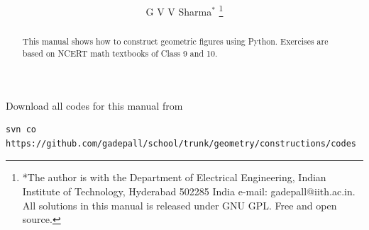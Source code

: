 \documentclass[journal,12pt,twocolumn]{IEEEtran}
\renewcommand\thesection{\arabic{section}}
\begin{document}
\let\StandardTheFigure\thefigure
\renewcommand{\thefigure}{\thesection}



\makeatletter
{}
\makeatother

\let\StandardTheFigure\thefigure
\let\StandardTheTable\thetable
\let\vec\mathbf





\def\putbox#1#2#3{\makebox[0in][l]{\makebox[#1][l]{}\raisebox{\baselineskip}[0in][0in]{\raisebox{#2}[0in][0in]{#3}}}}
     \def\rightbox#1{\makebox[0in][r]{#1}}
     \def\centbox#1{\makebox[0in]{#1}}
     \def\topbox#1{\raisebox{-\baselineskip}[0in][0in]{#1}}
     \def\midbox#1{\raisebox{-0.5\baselineskip}[0in][0in]{#1}}

\vspace{3cm}

\title{ 
}

\author{ G V V Sharma$^{*}$%
	\thanks{*The author is with the Department
		of Electrical Engineering, Indian Institute of Technology, Hyderabad
		502285 India e-mail:  gadepall@iith.ac.in. All solutions in this manual is released under GNU 
GPL.  Free and open source.}
	
}	

\maketitle

\tableofcontents

\bigskip

\renewcommand{\thefigure}{\theenumi}
\renewcommand{\thetable}{\theenumi}

\begin{abstract}
This manual shows how to construct geometric figures using Python. Exercises are based on  NCERT math textbooks of Class 9 and 10.
\end{abstract}
Download all codes for this manual from 
\begin{lstlisting}
svn co https://github.com/gadepall/school/trunk/geometry/constructions/codes
\end{lstlisting}
\end{document}
